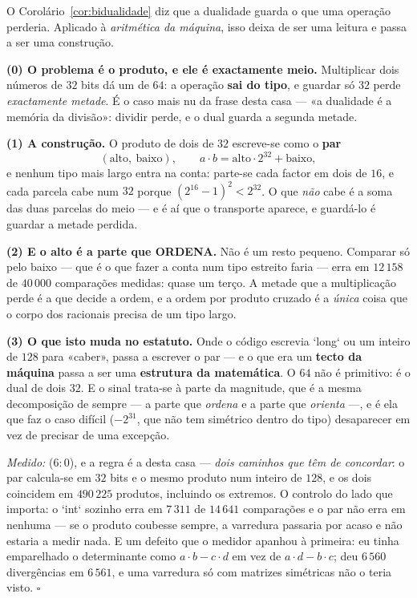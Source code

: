 \documentclass[livro.tex]{subfiles}
\begin{document}
\begin{corolario}\label{cor:dual32}
O Corolário~\ref{cor:bidualidade} diz que a dualidade guarda o que uma
operação perderia. Aplicado à \emph{aritmética da máquina}, isso deixa de
ser uma leitura e passa a ser uma construção.

\textbf{(0) O problema é o produto, e ele é exactamente meio.}
Multiplicar dois números de $32$ bits dá um de $64$: a operação
\textbf{sai do tipo}, e guardar só $32$ perde \emph{exactamente metade}.
É o caso mais nu da frase desta casa --- «a dualidade é a memória da
divisão»: dividir perde, e o dual guarda a segunda metade.

\textbf{(1) A construção.} O produto de dois de $32$ escreve-se como o
\textbf{par}
\[
\boxed{\;(\text{alto},\ \text{baixo}),
\qquad a\cdot b=\text{alto}\cdot 2^{32}+\text{baixo},\;}
\]
e nenhum tipo mais largo entra na conta: parte-se cada factor em dois de
$16$, e cada parcela cabe num $32$ porque $(2^{16}-1)^{2}<2^{32}$. O que
\emph{não} cabe é a soma das duas parcelas do meio --- e é aí que o
transporte aparece, e guardá-lo é guardar a metade perdida.

\textbf{(2) E o alto é a parte que ORDENA.} Não é um resto pequeno.
Comparar só pelo baixo --- que é o que fazer a conta num tipo estreito
faria --- erra em $12\,158$ de $40\,000$ comparações medidas: quase um
terço. A metade que a multiplicação perde é a que decide a ordem, e a
ordem por produto cruzado é a \emph{única} coisa que o corpo dos
racionais precisa de um tipo largo.

\textbf{(3) O que isto muda no estatuto.} Onde o código escrevia `long`
ou um inteiro de $128$ para «caber», passa a escrever o par --- e o que
era um \textbf{tecto da máquina} passa a ser uma \textbf{estrutura da
matemática}. O $64$ não é primitivo: é o dual de dois $32$. E o sinal
trata-se à parte da magnitude, que é a mesma decomposição de sempre --- a
parte que \emph{ordena} e a parte que \emph{orienta} ---, e é ela que faz
o caso difícil ($-2^{31}$, que não tem simétrico dentro do tipo)
desaparecer em vez de precisar de uma excepção.

\emph{Medido:}  ($6{:}0$), e a regra é a desta casa
--- \emph{dois caminhos que têm de concordar}: o par calcula-se em $32$
bits e o mesmo produto num inteiro de $128$, e os dois coincidem em
$490\,225$ produtos, incluindo os extremos. O controlo do lado que
importa: o `int` sozinho erra em $7\,311$ de $14\,641$ comparações e o
par não erra em nenhuma --- se o produto coubesse sempre, a varredura
passaria por acaso e não estaria a medir nada. E um defeito que o medidor
apanhou à primeira: eu tinha emparelhado o determinante como
$a\cdot b-c\cdot d$ em vez de $a\cdot d-b\cdot c$; deu $6\,560$
divergências em $6\,561$, e uma varredura só com matrizes simétricas não
o teria visto. $\square$
\end{corolario}
\end{document}
